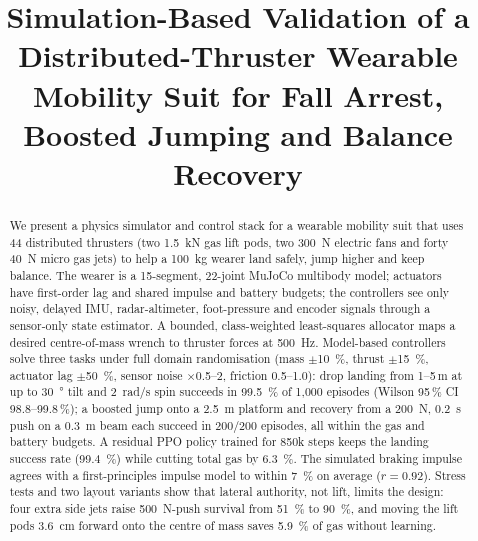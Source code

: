 \documentclass[conference]{IEEEtran}
\begin{document}
\title{Simulation-Based Validation of a Distributed-Thruster Wearable Mobility Suit for Fall Arrest, Boosted Jumping and Balance Recovery}

\author{
}

\maketitle

\begin{abstract}
We present a physics simulator and control stack for a wearable mobility suit that uses 44 distributed thrusters (two \SI{1.5}{kN} gas lift pods, two \SI{300}{N} electric fans and forty \SI{40}{N} micro gas jets) to help a \SI{100}{kg} wearer land safely, jump higher and keep balance. The wearer is a 15-segment, 22-joint MuJoCo multibody model; actuators have first-order lag and shared impulse and battery budgets; the controllers see only noisy, delayed IMU, radar-altimeter, foot-pressure and encoder signals through a sensor-only state estimator. A bounded, class-weighted least-squares allocator maps a desired centre-of-mass wrench to thruster forces at \SI{500}{Hz}. Model-based controllers solve three tasks under full domain randomisation (mass $\pm$\SI{10}{\%}, thrust $\pm$\SI{15}{\%}, actuator lag $\pm$\SI{50}{\%}, sensor noise $\times$0.5--2, friction 0.5--1.0): drop landing from 1--5\,m at up to \SI{30}{\degree} tilt and \SI{2}{rad/s} spin succeeds in \SI{99.5}{\%} of 1{,}000 episodes (Wilson 95\,\% CI 98.8--99.8\,\%); a boosted jump onto a \SI{2.5}{m} platform and recovery from a \SI{200}{N}, \SI{0.2}{s} push on a \SI{0.3}{m} beam each succeed in 200/200 episodes, all within the gas and battery budgets. A residual PPO policy trained for 850k steps keeps the landing success rate (\SI{99.4}{\%}) while cutting total gas by \SI{6.3}{\%}. The simulated braking impulse agrees with a first-principles impulse model to within \SI{7}{\%} on average ($r=0.92$). Stress tests and two layout variants show that lateral authority, not lift, limits the design: four extra side jets raise \SI{500}{N}-push survival from \SI{51}{\%} to \SI{90}{\%}, and moving the lift pods \SI{3.6}{cm} forward onto the centre of mass saves \SI{5.9}{\%} of gas without learning.
\end{abstract}
\end{document}
